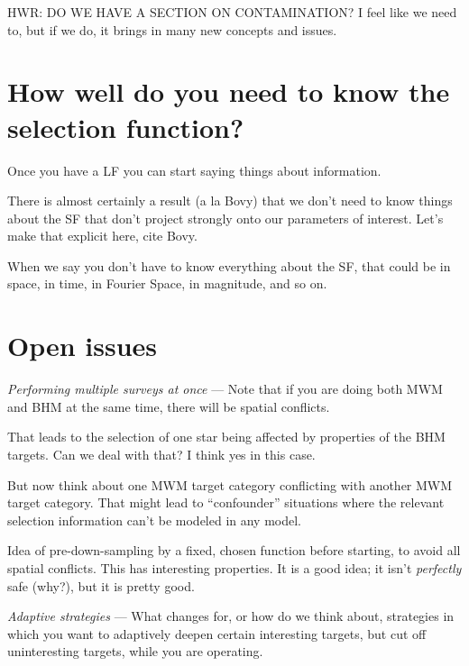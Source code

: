 \documentclass[modern]{aastex62}
\renewcommand{\paragraph}[1]{\medskip\noindent\textit{#1} ---}
\begin{document}
HWR: DO WE HAVE A SECTION ON CONTAMINATION? I feel like we need to,
but if we do, it brings in many new concepts and issues.

\section{How well do you need to know the selection function?}\label{sec:quality}

Once you have a LF you can start saying things about information.

There is almost certainly a result (a la Bovy) that we don't need to know
things about the SF that don't project strongly onto our parameters of interest.
Let's make that explicit here, cite Bovy.

When we say you don't have to know everything about the SF, that could be
in space, in time, in Fourier Space, in magnitude, and so on.

\section{Open issues}

\paragraph{Performing multiple surveys at once}
Note that if you are doing both MWM and BHM at the same time, there will be
spatial conflicts.

That leads to the selection of one star being affected by properties of the
BHM targets. Can we deal with that? I think yes in this case.

But now think about one MWM target category conflicting with another MWM target
category. That might lead to ``confounder'' situations where the relevant selection
information can't be modeled in any model.

Idea of pre-down-sampling by a fixed, chosen function before starting, to avoid
all spatial conflicts. This has interesting properties. It is a good idea; it isn't
\emph{perfectly} safe (why?), but it is pretty good.

\paragraph{Adaptive strategies}
What changes for, or how do we think about, strategies in which you want to
adaptively deepen certain interesting targets, but cut off uninteresting targets,
while you are operating.
\end{document}
